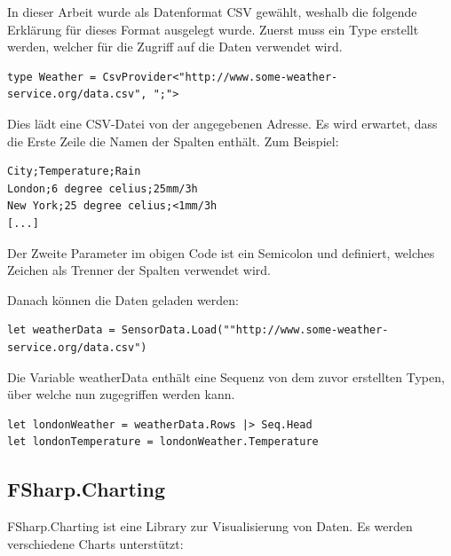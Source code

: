 In dieser Arbeit wurde als Datenformat CSV gewählt, weshalb die folgende Erklärung für dieses Format ausgelegt wurde.
Zuerst muss ein Type erstellt werden, welcher für die Zugriff auf die Daten verwendet wird.
\begin{lstlisting}
type Weather = CsvProvider<"http://www.some-weather-service.org/data.csv", ";">
\end{lstlisting}

Dies lädt eine CSV-Datei von der angegebenen Adresse. Es wird erwartet, dass die Erste Zeile die Namen der Spalten enthält. Zum Beispiel:

\begin{lstlisting}
City;Temperature;Rain
London;6 degree celius;25mm/3h
New York;25 degree celius;<1mm/3h
[...]
\end{lstlisting}

Der Zweite Parameter im obigen Code ist ein Semicolon und definiert, welches Zeichen als Trenner der Spalten verwendet wird.

Danach können die Daten geladen werden:
\begin{lstlisting}
let weatherData = SensorData.Load(""http://www.some-weather-service.org/data.csv")
\end{lstlisting}

Die Variable weatherData enthält eine Sequenz von dem zuvor erstellten Typen, über welche nun zugegriffen werden kann.

\begin{lstlisting}
let londonWeather = weatherData.Rows |> Seq.Head
let londonTemperature = londonWeather.Temperature
\end{lstlisting}

\subsection{FSharp.Charting}
FSharp.Charting ist eine Library zur Visualisierung von Daten. 
Es werden verschiedene Charts unterstützt:



